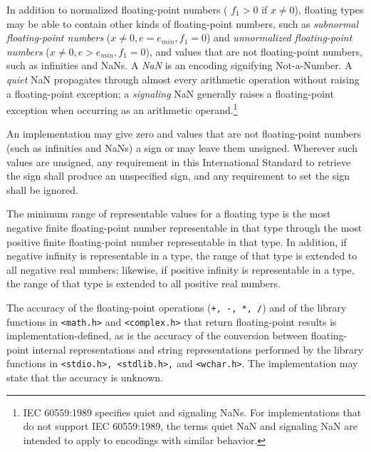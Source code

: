 In addition to normalized floating-point numbers ( $f_1 > 0$ if $x \ne 0$),
floating types may be able to contain other kinds of floating-point numbers,
such as \textit{subnormal floating-point numbers} ($x \ne 0, e = e_{min}, f_1 =
0$) and \textit{unnormalized floating-point numbers} ($x \ne 0, e > e_{min},
f_1 = 0$), and values that are not floating-point numbers, such as infinities
and NaNs. A \textit{NaN} is an encoding signifying Not-a-Number. A
\textit{quiet} NaN propagates through almost every arithmetic operation without
raising a floating-point exception; a \textit{signaling} NaN generally raises a
floating-point exception when occurring as an arithmetic operand.\footnote{IEC
  60559:1989 specifies quiet and signaling NaNs. For implementations that do
  not support IEC 60559:1989, the terms quiet NaN and signaling NaN are
  intended to apply to encodings with similar behavior.}

An implementation may give zero and values that are not floating-point numbers
(such as infinities and NaNs) a sign or may leave them unsigned. Wherever such
values are unsigned, any requirement in this International Standard to retrieve
the sign shall produce an unspecified sign, and any requirement to set the sign
shall be ignored. 

The minimum range of representable values for a floating type is the most
negative finite floating-point number representable in that type through the
most positive finite floating-point number representable in that type. In
addition, if negative infinity is representable in a type, the range of that
type is extended to all negative real numbers; likewise, if positive infinity
is representable in a type, the range of that type is extended to all positive
real numbers.

The accuracy of the floating-point operations (\texttt{+, -, *, /}) and of the
library functions in \texttt{<math.h>} and \texttt{<complex.h>} that return
floating-point results is implementation-defined, as is the accuracy of the
conversion between floating-point internal representations and string
representations performed by the library functions in \texttt{<stdio.h>,
  <stdlib.h>,} and \texttt{<wchar.h>}. The implementation may state that the
accuracy is unknown.


